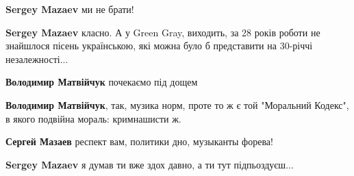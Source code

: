 \begin{itemize}
\textbf{Sergey Mazaev} ми не брати!

 
\textbf{Sergey Mazaev} класно. А у Green Gray, виходить, за 28 років роботи не знайшлося пісень українською, які можна було б представити на 30-річчі незалежності...

\begin{itemize}
 
\textbf{Володимир Матвійчук} почекаємо під дощем

 
\textbf{Володимир Матвійчук}, так, музика норм, проте то ж є той "Моральний Кодекс", в якого подвійна мораль: кримнашисти ж.
\end{itemize}

 
\textbf{Сергей Мазаев} респект вам, политики дно, музыканты форева!

 
\textbf{Sergey Mazaev} я думав ти вже здох давно, а ти тут підпьоздуєш...

 


\end{itemize}
